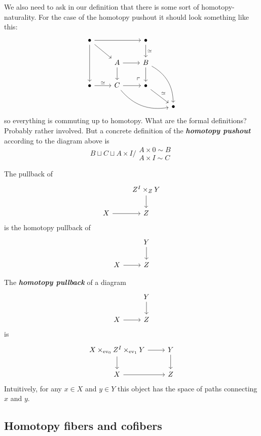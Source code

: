 \begin{remark}
	We also need to ask in our definition that there is some sort of homotopy-naturality. For the case of the homotopy pushout it should look something like this:
		\[\begin{tikzcd}
			\bullet\arrow[rr]\arrow[dd]\arrow[dr]&&\bullet\arrow[d,"\simeq "]\\
			&A\arrow[r]\arrow[d]&B\arrow[d]\arrow[ddr,bend left]\\
			\bullet\arrow[r,"\simeq "]&C\arrow[r]\arrow[drr,bend right]&\bullet\arrow[ul, phantom, "\ulcorner", very near start]\arrow[dr,"\simeq" ]\\
			&&&\bullet
		\end{tikzcd}\]
	so everything is commuting up to homotopy. {\color{magenta}What are the formal definitions? Probably rather involved.} But a concrete definition of the \textit{\textbf{homotopy pushout}} according to the diagram above is
	\[B\sqcup C\sqcup A\times I\Big/\substack{A\times 0\sim B \\ A\times I\sim C}\]
\end{remark}
\begin{remark}
		The pullback of
	\[\begin{tikzcd}
		&Z^I\times_ZY\arrow[d]\\
		X\arrow[r]&Z
	\end{tikzcd}\]
	is the homotopy pullback of
	\[\begin{tikzcd}
		&Y\arrow[d]\\
		X\arrow[r]&Z
	\end{tikzcd}\]
\end{remark}
\begin{defn}
	The \textbf{\textit{homotopy pullback}} of a diagram
		\[\begin{tikzcd}
			&Y\arrow[d]\\
			X\arrow[r]&Z
		\end{tikzcd}\]
		is
		\[\begin{tikzcd}
			X\times_{\operatorname{ev}_0}Z^I\times_{\operatorname{ev}_1}Y\arrow[d]\arrow[r]&Y\arrow[d]\\
			X\arrow[r]&Z
		\end{tikzcd}\]
		Intuitively, for any $x\in X$ and $y\in Y$ this object has the space of paths connecting $x$ and $y$.
\end{defn}

\subsection*{Homotopy fibers and cofibers}

